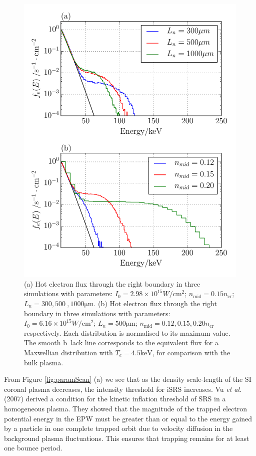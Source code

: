 \begin{figure}[!ht]
   \centering
    \includegraphics[width=0.7\columnwidth]{Chapters/C4_iSRS/fig7_7a_7b.pdf}
    \caption{(a) Hot electron flux through the right boundary in three simulations with parameters: $I_0 = 2.98\times 10^{15} \si{W / \centi \metre^2}$; $n_\mathrm{mid}=0.15 n_\mathrm{cr}$; $L_n=300,500\
,1000\si{\micro\metre}$.   (b) Hot electron flux through the right boundary in three simulations with parameters:
   $I_0 = 6.16\times 10^{15} \si{W / \centi \metre^2}$;  $L_n=500\si{\micro\metre}$; $n_\mathrm{mid}=0.12,0.15,0.20 n_\mathrm{cr}$ respectively. Each distribution is normalised to its maximum value. The smooth b\
lack line corresponds to the equivalent flux for a Maxwellian
   distribution with $T_e=4.5\si{\kilo \electronvolt}$, for comparison with the
   bulk plasma.}
    \label{fig:hotelectrons}
\end{figure}{}

From Figure \ref{fig:paramScan} (a) we see that as the density scale-length of the SI coronal plasma decreases, the intensity threshold for iSRS increases. Vu \textit{et al.} (2007) \citep{Vu2007} derived a condition for the kinetic inflation threshold of SRS in a homogeneous plasma. They showed that the magnitude of the trapped electron potential energy in the EPW must be greater than or equal to the energy gained by a particle in one complete trapped orbit due to velocity diffusion in the
background plasma fluctuations. This ensures that trapping remains for at least one bounce period.

